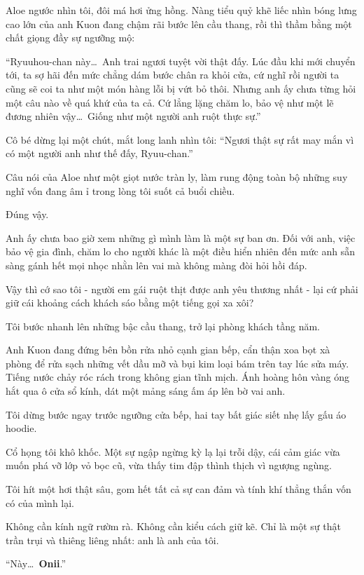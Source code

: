 \documentclass[../main.tex]{subfiles}
\begin{document}
Aloe ngước nhìn tôi, đôi má hơi ửng hồng. Nàng tiểu quỷ khẽ liếc nhìn bóng lưng cao lớn của anh Kuon đang chậm rãi bước lên cầu thang, rồi thì thầm bằng một chất giọng đầy sự ngưỡng mộ:

``Ryuuhou-chan này\dots\ Anh trai ngươi tuyệt vời thật đấy. Lúc đầu khi mới chuyển tới, ta sợ hãi đến mức chẳng dám bước chân ra khỏi cửa, cứ nghĩ rồi người ta cũng sẽ coi ta như một món hàng lỗi bị vứt bỏ thôi. Nhưng anh ấy chưa từng hỏi một câu nào về quá khứ của ta cả. Cứ lẳng lặng chăm lo, bảo vệ như một lẽ đương nhiên vậy\dots\ Giống như một người anh ruột thực sự.''

Cô bé dừng lại một chút, mắt long lanh nhìn tôi: ``Ngươi thật sự rất may mắn vì có một người anh như thế đấy, Ryuu-chan.''

Câu nói của Aloe như một giọt nước tràn ly, làm rung động toàn bộ những suy nghĩ vốn đang âm ỉ trong lòng tôi suốt cả buổi chiều.

Đúng vậy.

Anh ấy chưa bao giờ xem những gì mình làm là một sự ban ơn. Đối với anh, việc bảo vệ gia đình, chăm lo cho người khác là một điều hiển nhiên đến mức anh sẵn sàng gánh hết mọi nhọc nhằn lên vai mà không màng đòi hỏi hồi đáp.

Vậy thì cớ sao tôi - người em gái ruột thịt được anh yêu thương nhất - lại cứ phải giữ cái khoảng cách khách sáo bằng một tiếng gọi xa xôi?

Tôi bước nhanh lên những bậc cầu thang, trở lại phòng khách tầng năm.

Anh Kuon đang đứng bên bồn rửa nhỏ cạnh gian bếp, cẩn thận xoa bọt xà phòng để rửa sạch những vết dầu mỡ và bụi kim loại bám trên tay lúc sửa máy. Tiếng nước chảy róc rách trong không gian tĩnh mịch. Ánh hoàng hôn vàng óng hắt qua ô cửa sổ kính, dát một mảng sáng ấm áp lên bờ vai anh.

Tôi dừng bước ngay trước ngưỡng cửa bếp, hai tay bất giác siết nhẹ lấy gấu áo hoodie.

Cổ họng tôi khô khốc. Một sự ngập ngừng kỳ lạ lại trỗi dậy, cái cảm giác vừa muốn phá vỡ lớp vỏ bọc cũ, vừa thấy tim đập thình thịch vì ngượng ngùng.

Tôi hít một hơi thật sâu, gom hết tất cả sự can đảm và tính khí thẳng thắn vốn có của mình lại.

Không cần kính ngữ rườm rà. Không cần kiểu cách giữ kẽ. Chỉ là một sự thật trần trụi và thiêng liêng nhất: anh là anh của tôi.

``Này\dots\ \textbf{Onii}.''
\end{document}
